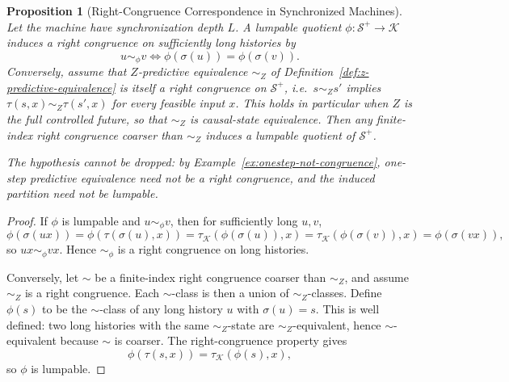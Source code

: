 \documentclass[12pt]{article}
\newtheorem{proposition}[theorem]{Proposition}
\theoremstyle{definition}
\newcommand{\Splus}{\mathcal S^{+}}
\begin{document}
\begin{proposition}[Right-Congruence Correspondence in Synchronized Machines]
\label{prop:lumpability}
Let the machine have synchronization depth $L$.  A lumpable quotient
$\phi:\Splus\to\mathcal K$ induces a right congruence on sufficiently long
histories by
\[
u\sim_\phi v
\iff
\phi(\sigma(u))=\phi(\sigma(v)).
\]
Conversely, assume that $Z$-predictive equivalence $\sim_Z$ of
Definition~\ref{def:z-predictive-equivalence} is itself a right congruence on
$\Splus$, i.e.\ $s\sim_Zs'$ implies $\tau(s,x)\sim_Z\tau(s',x)$ for every
feasible input $x$.  This holds in particular when $Z$ is the full controlled
future, so that $\sim_Z$ is causal-state equivalence.  Then any finite-index
right congruence coarser than $\sim_Z$ induces a lumpable quotient of
$\Splus$.

The hypothesis cannot be dropped: by Example~\ref{ex:onestep-not-congruence},
one-step predictive equivalence need not be a right congruence, and the
induced partition need not be lumpable.
\end{proposition}

\begin{proof}
If $\phi$ is lumpable and $u\sim_\phi v$, then for sufficiently long $u,v$,
\[
\phi(\sigma(ux))
=
\phi(\tau(\sigma(u),x))
=
\tau_{\mathcal K}(\phi(\sigma(u)),x)
=
\tau_{\mathcal K}(\phi(\sigma(v)),x)
=
\phi(\sigma(vx)),
\]
so $ux\sim_\phi vx$.  Hence $\sim_\phi$ is a right congruence on long
histories.

Conversely, let $\sim$ be a finite-index right congruence coarser than
$\sim_Z$, and assume $\sim_Z$ is a right congruence.  Each $\sim$-class is then
a union of $\sim_Z$-classes.  Define $\phi(s)$ to be the $\sim$-class of any
long history $u$ with $\sigma(u)=s$.  This is well defined: two long histories
with the same $\sim_Z$-state are $\sim_Z$-equivalent, hence $\sim$-equivalent
because $\sim$ is coarser.  The right-congruence property gives
\[
\phi(\tau(s,x))=\tau_{\mathcal K}(\phi(s),x),
\]
so $\phi$ is lumpable.
\end{proof}
\end{document}

